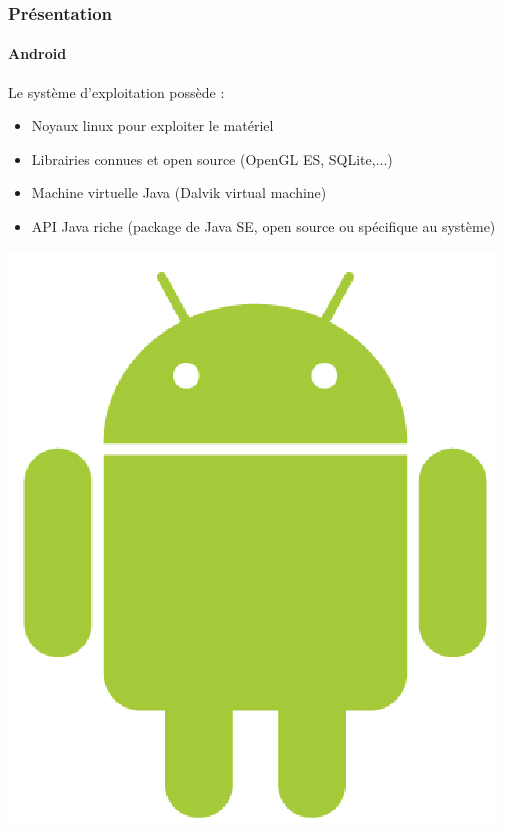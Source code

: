 \begin{frame}
\frametitle{Présentation}
\framesubtitle{Android}

	\begin{minipage}{8cm}
		Le système d'exploitation possède : \\ 

	\begin{itemize} 
		\item Noyaux linux pour exploiter le matériel
		\item Librairies connues et open source (OpenGL ES, SQLite,...)
		\item Machine virtuelle Java (Dalvik virtual machine)
		\item API Java riche (package de Java SE, open source ou spécifique au système)
	\end{itemize}
	\end{minipage} 
	\includegraphics[scale=0.2]{img/android.png} 

\end{frame}


 


